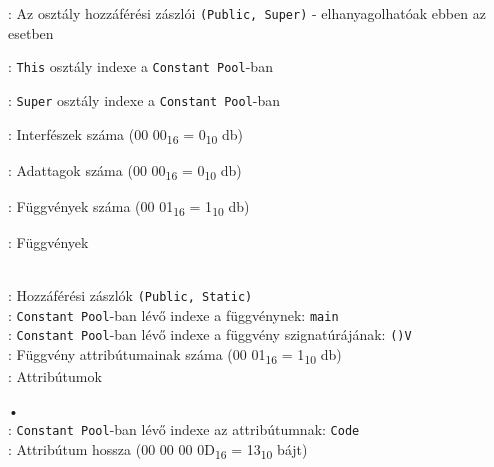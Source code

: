 \begin{compactitem}
\item {}: Az osztály hozzáférési zászlói \lstinline{(Public, Super)} - elhanyagolhatóak ebben az esetben
\item {}: \lstinline{This} osztály indexe a \lstinline{Constant Pool}-ban
\item {}: \lstinline{Super} osztály indexe a \lstinline{Constant Pool}-ban
\item {}: Interfészek száma (00 00\textsubscript{16} = 0\textsubscript{10} db)
\item {}: Adattagok száma (00 00\textsubscript{16} = 0\textsubscript{10} db)
\item {}: Függvények száma (00 01\textsubscript{16} = 1\textsubscript{10} db)
\item {}: Függvények
\begin{compactitem}
    \setlength\itemsep{-5px}
    \item {}     \\
    : Hozzáférési zászlók \lstinline{(Public, Static)} \\
    : \lstinline{Constant Pool}-ban lévő indexe a függvénynek: \lstinline{main} \\
    : \lstinline{Constant Pool}-ban lévő indexe a függvény szignatúrájának: \lstinline{()V} \\
    : Függvény attribútumainak száma (00 01\textsubscript{16} = 1\textsubscript{10} db) \\
    : Attribútumok
    \begin{compactitem}
        \setlength\itemsep{-5px}
        \item[•]    \\
        : \lstinline{Constant Pool}-ban lévő indexe az attribútumnak: \lstinline{Code} \\
        : Attribútum hossza (00 00 00 0D\textsubscript{16} = 13\textsubscript{10} bájt) \\

\end{compactitem}
\end{compactitem}
\end{compactitem}
